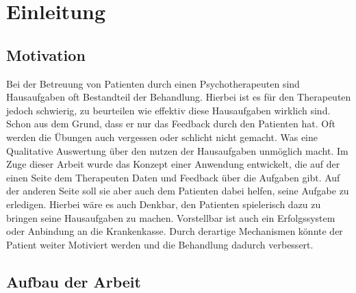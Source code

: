 \chapter{Einleitung}
\section{Motivation}
Bei der Betreuung von Patienten durch einen Psychotherapeuten sind Hausaufgaben oft Bestandteil der Behandlung. Hierbei ist es für den Therapeuten jedoch schwierig, zu beurteilen wie effektiv diese Hausaufgaben wirklich sind. Schon aus dem Grund, dass er nur das Feedback durch den Patienten hat. Oft werden die Übungen auch vergessen oder schlicht nicht gemacht. Was eine Qualitative Auswertung über den nutzen der Hausaufgaben unmöglich macht. Im Zuge dieser Arbeit wurde das Konzept einer Anwendung entwickelt, die auf der einen Seite dem Therapeuten Daten und Feedback über die Aufgaben gibt. Auf der anderen Seite soll sie aber auch dem Patienten dabei helfen, seine Aufgabe zu erledigen. Hierbei wäre es auch Denkbar, den Patienten spielerisch dazu zu bringen seine Hausaufgaben zu machen. Vorstellbar ist auch ein Erfolgssystem oder Anbindung an die Krankenkasse. Durch derartige Mechanismen könnte der Patient weiter Motiviert werden und die Behandlung dadurch verbessert.

\section{Aufbau der Arbeit}
